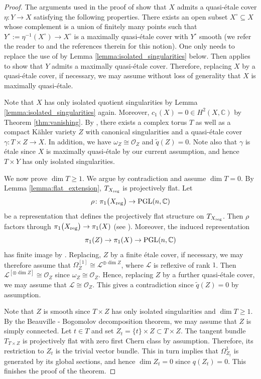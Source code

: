 \documentclass[english,10pt]{amsart}
\renewcommand{\ge}{\geqslant}
\newcommand{\sL}{\mathscr{L}}
\newcommand{\sO}{\mathscr{O}}
\theoremstyle{definition}
\theoremstyle{remark}
\numberwithin{equation}{section}
\begin{document}
\begin{proof}
The arguments used in the proof of \cite[Theorem 5.1]{CGGN22} show that $X$ admits a quasi-\'etale cover $\eta \colon Y \to X$ satisfying the following properties. There exists an open subset $X^\circ \subseteq X$ whose complement is a union of finitely many points such that $Y^\circ:=\eta^{-1}(X^\circ) \to X^\circ$ is a maximally quasi-\'etale cover with $Y^\circ$ smooth (we refer the reader to \cite[Definition 5.3]{CGGN22} and the references therein for this notion). One only needs to replace the use of \cite[Proposition 5.5]{CGGN22} by Lemma \ref{lemma:isolated_singularities} below. Then \cite[Proposition 5.9]{CGGN22} applies to show that $Y$ admits a maximally quasi-\'etale cover. Therefore, replacing $X$ by a quasi-\'etale cover, if necessary, we may assume without loss of generality that $X$ is maximally quasi-\'etale.

Note that $X$ has only isolated quotient singularities by Lemma \ref{lemma:isolated_singularities} again. Moreover, $c_1(X)=0 \in H^2(X,\mathbb{C})$ by Theorem \ref{thm:vanishing}. By \cite[Corollary 4.2]{CGGN22}, there exists a complex torus $T$ as well as a compact K\"ahler variety $Z$ with canonical singularities and a quasi-\'etale cover $\gamma \colon T \times Z \to X$. In addition, we have $\omega_Z\cong \sO_Z$ and $\tilde{q}(Z)=0$. Note also that $\gamma$ is \'etale since $X$ is maximally quasi-\'etale by our current assumption, and hence $T \times Y$ has only isolated singularities. 

We now prove $\dim T \ge 1$. We argue by contradiction and assume $\dim T =0$. By Lemma \ref{lemma:flat_extension}, $T_{X_{\textup{reg}}}$ is projectively flat. Let 
\[
\rho \colon \pi_1\big(X_{\textup{reg}}\big) \to \textup{PGL}(n,\mathbb{C})
\]
be a representation that defines the projectively flat structure on $T_{X_{\textup{reg}}}$. Then $\rho$
factors through $\pi_1\big(X_{\textup{reg}}\big) \to \pi_1(X)$ (see \cite[Remark 5.4]{CGGN22}).
Moreover, the induced representation
\[
\pi_1(Z) \to \pi_1(X) \to \textup{PGL}(n,\mathbb{C}) 
\]
has finite image by \cite[Theorem 7.2]{CGGN22}. Replacing, $Z$ by a finite \'etale cover, if necessary, we may therefore assume that $\Omega_Z^{[1]} \cong \sL^{\oplus \dim Z}$, where $\sL$ is reflexive of rank $1$. Then 
$\sL^{[\otimes \dim Z]}\cong \sO_Z$ since $\omega_Z\cong \sO_Z$. Hence, replacing $Z$ by a further quasi-\'etale cover, we may assume that $\sL \cong \sO_Z$. This gives a contradiction since $\tilde{q}(Z)=0$ by assumption. 

Note that $Z$ is smooth since $T \times Z$ has only isolated singularities and $\dim T \ge 1$. By the Beauville - Bogomolov decomposition theorem, we may assume that $Z$ is simply connected. Let $t \in T$ and set $Z_t = \{t\}\times Z \subset T\times Z$. The tangent bundle $T_{T \times Z}$ is projectively flat with zero first Chern class by assumption. Therefore, its restriction to $Z_t$ is the trivial vector bundle. This in turn implies that $\Omega^1_{Z_t}$ is generated by its global sections, and hence $\dim Z_t =0$ since $q(Z_t)=0$.
This finishes the proof of the theorem.
\end{proof}
\end{document}
